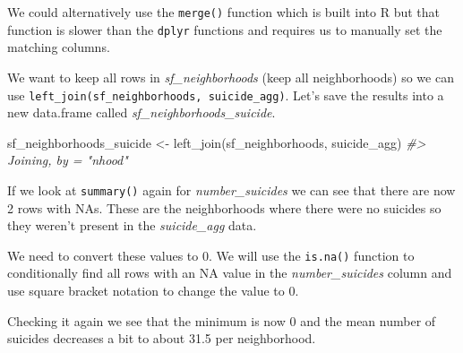 \documentclass[
]{krantz}
\makeatletter
\newenvironment{Shaded}{\begin{snugshade}}{\end{snugshade}}
\newcommand{\CommentTok}[1]{\textcolor[rgb]{0.37,0.37,0.37}{\textit{#1}}}
\newcommand{\DecValTok}[1]{\textcolor[rgb]{0.06,0.06,0.06}{#1}}
\newcommand{\FunctionTok}[1]{\textcolor[rgb]{0,0,0}{#1}}
\newcommand{\NormalTok}[1]{#1}
\newcommand{\OtherTok}[1]{\textcolor[rgb]{0.37,0.37,0.37}{#1}}
\newcommand{\SpecialCharTok}[1]{\textcolor[rgb]{0,0,0}{#1}}
\newenvironment{kframe}{%
\medskip{}
\setlength{\fboxsep}{.8em}
 \def\at@end@of@kframe{}%
 \ifinner\ifhmode%
  \def\at@end@of@kframe{\end{minipage}}%
  \begin{minipage}{\columnwidth}%
 \fi\fi%
 \def\FrameCommand##1{\hskip\@totalleftmargin \hskip-\fboxsep
 \colorbox{shadecolor}{##1}\hskip-\fboxsep
     \hskip-\linewidth \hskip-\@totalleftmargin \hskip\columnwidth}%
 \MakeFramed {\advance\hsize-\width
   \@totalleftmargin\z@ \linewidth\hsize
   \@setminipage}}%
 {\par\unskip\endMakeFramed%
 \at@end@of@kframe}
\renewenvironment{Shaded}{\begin{kframe}}{\end{kframe}}
\makeatother
\begin{document}
We could alternatively use the \texttt{merge()} function which is built into R but that function is slower than the \texttt{dplyr} functions and requires us to manually set the matching columns.

We want to keep all rows in \emph{sf\_neighborhoods} (keep all neighborhoods) so we can use \texttt{left\_join(sf\_neighborhoods,\ suicide\_agg)}. Let's save the results into a new data.frame called \emph{sf\_neighborhoods\_suicide}.

\begin{Shaded}
\begin{Highlighting}[]
\NormalTok{sf\_neighborhoods\_suicide }\OtherTok{\textless{}{-}} \FunctionTok{left\_join}\NormalTok{(sf\_neighborhoods, suicide\_agg)}
\CommentTok{\#\textgreater{} Joining, by = "nhood"}
\end{Highlighting}
\end{Shaded}

If we look at \texttt{summary()} again for \emph{number\_suicides} we can see that there are now 2 rows with NAs. These are the neighborhoods where there were no suicides so they weren't present in the \emph{suicide\_agg} data.

\begin{Shaded}
\end{Shaded}

We need to convert these values to 0. We will use the \texttt{is.na()} function to conditionally find all rows with an NA value in the \emph{number\_suicides} column and use square bracket notation to change the value to 0.

\begin{Shaded}
\end{Shaded}

Checking it again we see that the minimum is now 0 and the mean number of suicides decreases a bit to about 31.5 per neighborhood.
\end{document}
